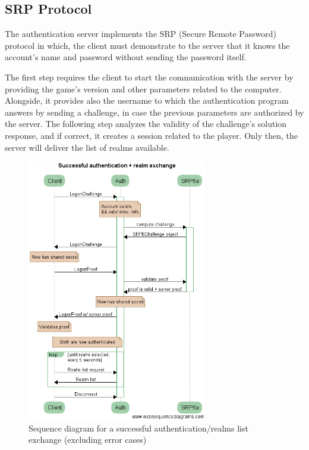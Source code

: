 \documentclass[paper=a4, fontsize=11pt]{scrartcl}
\begin{document}
\subsection{SRP Protocol}
The authentication server implements the SRP (Secure Remote Password) protocol 
in which, the client must demonstrate to the server that it knows the account's 
name and password without sending the password itself.

The first step requires the client to start the communication with the server
by providing the game's version and other parameters related to the computer. 
Alongside, it provides also the username to which the authentication program 
answers by sending a challenge, in case the previous parameters are 
authorized by the server. The following step analyzes the validity of the 
challenge's solution response, and if correct, it creates a session related to
the player.
Only then, the server will deliver the list of realms available.

\begin{figure}[htb!]
    \centering
    \includegraphics[width=0.7\textwidth]{authexch}
    \caption{Sequence diagram for a successful authentication/realms list
    exchange (excluding error cases)}
\end{figure}
\end{document}
